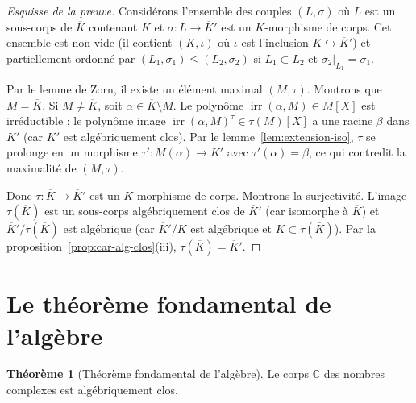 \documentclass[12pt,a4paper,openany]{book}
\theoremstyle{definition}
\newtheorem{theoreme}{Théorème}[chapter]
\newcommand{\C}{\mathbb{C}}
\newcommand{\irr}{\operatorname{irr}}
\begin{document}
\begin{proof}[Esquisse de la preuve]
Considérons l'ensemble des couples $(L, \sigma)$ où $L$ est un sous-corps de
$\overline{K}$ contenant $K$ et $\sigma \colon L \to \overline{K}'$ est un
$K$-morphisme de corps. Cet ensemble est non vide (il contient
$(K, \iota)$ où $\iota$ est l'inclusion $K \hookrightarrow \overline{K}'$) et
partiellement ordonné par $(L_1, \sigma_1) \leq (L_2, \sigma_2)$ si
$L_1 \subset L_2$ et $\sigma_2|_{L_1} = \sigma_1$.

Par le lemme de Zorn, il existe un élément maximal $(M, \tau)$. Montrons que
$M = \overline{K}$. Si $M \neq \overline{K}$, soit $\alpha \in \overline{K}
\setminus M$. Le polynôme $\irr(\alpha, M) \in M[X]$ est irréductible ; le
polynôme image $\irr(\alpha, M)^\tau \in \tau(M)[X]$ a une racine $\beta$ dans
$\overline{K}'$ (car $\overline{K}'$ est algébriquement clos). Par le
lemme~\ref{lem:extension-iso}, $\tau$ se prolonge en un morphisme
$\tau' \colon M(\alpha) \to \overline{K}'$ avec $\tau'(\alpha) = \beta$, ce qui
contredit la maximalité de $(M, \tau)$.

Donc $\tau \colon \overline{K} \to \overline{K}'$ est un $K$-morphisme de corps.
Montrons la surjectivité. L'image $\tau(\overline{K})$ est un sous-corps
algébriquement clos de $\overline{K}'$ (car isomorphe à $\overline{K}$) et
$\overline{K}'/\tau(\overline{K})$ est algébrique (car $\overline{K}'/K$ est
algébrique et $K \subset \tau(\overline{K})$). Par la
proposition~\ref{prop:car-alg-clos}(iii), $\tau(\overline{K}) = \overline{K}'$.
\end{proof}

\section{Le théorème fondamental de l'algèbre}
\label{sec:thm-fondamental-algebre}

\begin{theoreme}[Théorème fondamental de l'algèbre]\label{thm:fta}
Le corps $\C$ des nombres complexes est algébriquement clos.
\end{theoreme}
\end{document}
